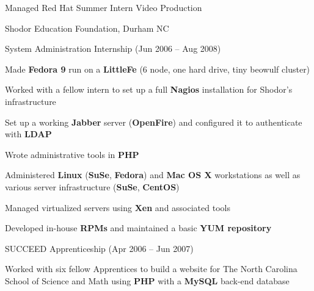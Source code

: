 \documentclass[11pt]{article}
\begin{document}
\begin{itemz}
\begin{itemz}[-]
\begin{itemz}[*]
                            \item Managed Red Hat Summer Intern Video Production
                        \end{itemz}
                \end{itemz}
            \item Shodor Education Foundation, Durham NC
                \begin{itemz}[-]
                    \item System Administration Internship (Jun 2006 -- Aug 2008)
                        \begin{itemz}[*]
                            \item Made {\bf Fedora 9} run on a {\bf LittleFe} (6 node, one hard drive, tiny beowulf cluster)
                            \item Worked with a fellow intern to set up a full {\bf  Nagios} installation for Shodor's infrastructure
                            \item Set up a working {\bf Jabber} server ({\bf OpenFire}) and configured it to authenticate with {\bf LDAP}
                            \item Wrote administrative tools in {\bf PHP}
                            \item Administered {\bf Linux} ({\bf SuSe}, {\bf Fedora}) and {\bf Mac OS X} workstations as well as various server infrastructure ({\bf SuSe}, {\bf CentOS})
                            \item Managed virtualized servers using {\bf Xen} and associated tools
                            \item Developed in-house {\bf RPMs} and maintained a basic {\bf YUM repository}
                        \end{itemz}
                    \item SUCCEED Apprenticeship (Apr 2006 -- Jun 2007)
                        \begin{itemz}[*]
                            \item Worked with six fellow Apprentices to build a website for The North Carolina School of Science and Math using {\bf PHP} with a {\bf MySQL} back-end database
                        \end{itemz}
                \end{itemz}
        \end{itemz}
    
\end{document}
